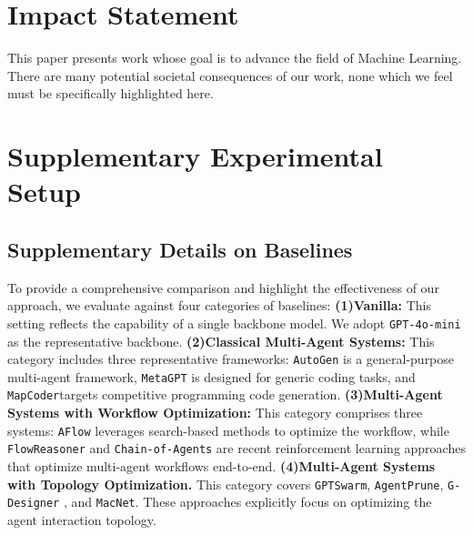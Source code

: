 \documentclass{article}
\theoremstyle{definition}
\begin{document}
\section{Impact Statement}

This paper presents work whose goal is to advance the field of Machine Learning. There are many potential societal consequences of our work, none which we feel must be specifically highlighted here.
\nocite{langley00}




\newpage
\appendix
\onecolumn
\section{Supplementary Experimental Setup}

\subsection{Supplementary Details on Baselines}
\label{appendix:baselines}
To provide a comprehensive comparison and highlight the effectiveness of our approach, we evaluate against four categories of baselines:  
\textbf{(1)Vanilla: } This setting reflects the capability of a single backbone model. We adopt \texttt{GPT-4o-mini} as the representative backbone.  \textbf{(2)Classical Multi-Agent Systems: } This category includes three representative frameworks: \texttt{AutoGen}\citep{wu2024autogen} is a general-purpose multi-agent framework, \texttt{MetaGPT}\citep{hong2024metagpt} is designed for generic coding tasks, and \texttt{MapCoder}\citep{islam2024mapcoder}targets competitive programming code generation. 
\textbf{(3)Multi-Agent Systems with Workflow Optimization: } This category comprises three systems: \texttt{AFlow}\citep{zhang2024aflow} leverages search-based methods to optimize the workflow, while \texttt{FlowReasoner}\citep{gao2025flowreasoner} and \texttt{Chain-of-Agents} are recent reinforcement learning approaches that optimize multi-agent workflows end-to-end. \textbf{(4)Multi-Agent Systems with Topology Optimization.} This category covers \texttt{GPTSwarm}\citep{zhuge2024gptswarm}, \texttt{AgentPrune}\citep{zhang2024cut}, \texttt{G-Designer} \citep{zhang2024g}, and \texttt{MacNet}\citep{qian2024scaling}. These approaches explicitly focus on optimizing the agent interaction topology. 
\end{document}
